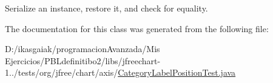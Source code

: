 Serialize an instance, restore it, and check for equality. 

The documentation for this class was generated from the following file\+:\begin{DoxyCompactItemize}
\item 
D\+:/ikasgaiak/programacion\+Avanzada/\+Mis Ejercicios/\+P\+B\+Ldefinitibo2/libs/jfreechart-\/1../tests/org/jfree/chart/axis/\mbox{\hyperlink{_category_label_position_test_8java}{Category\+Label\+Position\+Test.\+java}}\end{DoxyCompactItemize}
